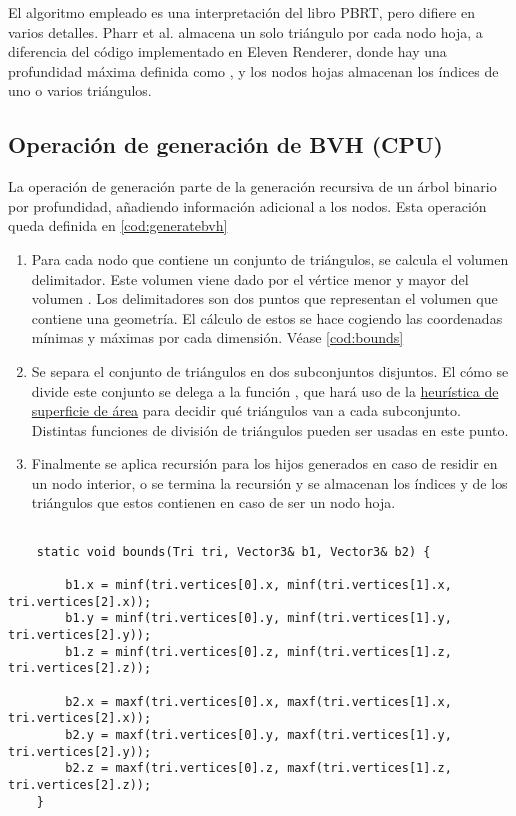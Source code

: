 El algoritmo empleado es una interpretación del libro PBRT, pero difiere en varios detalles. Pharr et al. \cite{pharr2016physically} almacena un solo triángulo por cada nodo hoja, a diferencia del código implementado en Eleven Renderer, donde hay una profundidad máxima definida como , y los nodos hojas almacenan los índices de uno o varios triángulos. 

\subsection{Operación de generación de BVH (CPU)}

La operación de generación parte de la generación recursiva de un árbol binario por profundidad, añadiendo información adicional a los nodos. Esta operación queda definida en \autoref{cod:generatebvh}

\begin{enumerate}
	
\item Para cada nodo que contiene un conjunto de triángulos, se calcula el volumen delimitador. Este volumen viene dado por el vértice menor y mayor del volumen . 
Los delimitadores son dos puntos que representan el volumen que contiene una geometría. El cálculo de estos se hace cogiendo las coordenadas mínimas y máximas por cada dimensión. Véase \autoref{cod:bounds}

\item Se separa el conjunto de triángulos en dos subconjuntos disjuntos. El cómo se divide este conjunto se delega a la función , que hará uso de la \hyperref[sub:sah]{heurística de superficie de área} para decidir qué triángulos van a cada subconjunto. Distintas funciones de división de triángulos pueden ser usadas en este punto.

\item Finalmente se aplica recursión para los hijos generados en caso de residir en un nodo interior, o se termina la recursión y se almacenan los índices  y  de los triángulos que estos contienen en caso de ser un nodo hoja.

\end{enumerate}

\begin{minipage}[c]{0.95\textwidth}
	\begin{lstlisting}[label={cod:bounds}, caption={Cálculo de delimitadores}]

	static void bounds(Tri tri, Vector3& b1, Vector3& b2) {

		b1.x = minf(tri.vertices[0].x, minf(tri.vertices[1].x, tri.vertices[2].x));
		b1.y = minf(tri.vertices[0].y, minf(tri.vertices[1].y, tri.vertices[2].y));
		b1.z = minf(tri.vertices[0].z, minf(tri.vertices[1].z, tri.vertices[2].z));

		b2.x = maxf(tri.vertices[0].x, maxf(tri.vertices[1].x, tri.vertices[2].x));
		b2.y = maxf(tri.vertices[0].y, maxf(tri.vertices[1].y, tri.vertices[2].y));
		b2.z = maxf(tri.vertices[0].z, maxf(tri.vertices[1].z, tri.vertices[2].z));
	}
	
\end{lstlisting}
\end{minipage}

